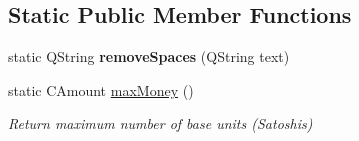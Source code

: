 \subsection*{Static Public Member Functions}
\begin{DoxyCompactItemize}
\item 
\mbox{\label{class_bitcoin_units_a9354c3d913372b03101a23dc9cd18023}} 
static Q\+String {\bfseries remove\+Spaces} (Q\+String text)
\item 
\mbox{\label{class_bitcoin_units_a310bc10d6973f335b5757a341909b7fe}} 
static C\+Amount \mbox{\hyperlink{class_bitcoin_units_a310bc10d6973f335b5757a341909b7fe}{max\+Money}} ()
\begin{DoxyCompactList}\small\item\em Return maximum number of base units (Satoshis) \end{DoxyCompactList}\end{DoxyCompactItemize}
